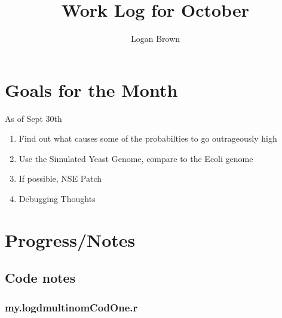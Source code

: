 

\title{Work Log for October}
\author{Logan Brown}



\maketitle
\tableofcontents

\newpage


\section{Goals for the Month}
As of Sept 30th
\begin{enumerate}
\item Find out what causes some of the probabilties to go outrageously high
\item Use the Simulated Yeast Genome, compare to the Ecoli genome
\item If possible, NSE Patch
\item Debugging Thoughts
\end{enumerate}


\section{Progress/Notes}

\subsection{Code notes}

\subsubsection{my.logdmultinomCodOne.r}

